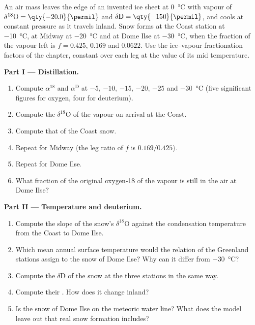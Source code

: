 \begin{problem}\label{pb:b3:stable-isotopes:1}
An air mass leaves the edge of an invented ice sheet at \qty{0}{\celsius}
with vapour of $\delta^{18}\mathrm O = \qty{-20.0}{\permil}$ and $\delta\mathrm D =
\qty{-150}{\permil}$, and cools at constant pressure as it travels inland.
Snow forms at the Coast station at \qty{-10}{\celsius}, at Midway at
\qty{-20}{\celsius} and at Dome Ilse at \qty{-30}{\celsius}, when the fraction
of the vapour left is $f = 0.425$, $0.169$ and $0.0622$. Use the ice--vapour
fractionation factors of the chapter, constant over each leg at the value of
its mid temperature.

\medskip\noindent\textbf{Part I --- Distillation.}
\begin{enumerate}
\item Compute $\alpha^{18}$ and $\alpha^{\mathrm D}$ at $-5$, $-10$, $-15$, $-20$,
$-25$ and \qty{-30}{\celsius} (five significant figures for oxygen, four for
deuterium).
\item Compute the $\delta^{18}\mathrm O$ of the vapour on arrival at the Coast.
\item Compute that of the Coast snow.
\item Repeat for Midway (the leg ratio of $f$ is $0.169/0.425$).
\item Repeat for Dome Ilse.
\item What fraction of the original oxygen-18 of the vapour is still in the air
at Dome Ilse?
\end{enumerate}

\medskip\noindent\textbf{Part II --- Temperature and deuterium.}
\begin{enumerate}[resume]
\item Compute the slope of the snow's $\delta^{18}\mathrm O$ against the
condensation temperature from the Coast to Dome Ilse.
\item Which mean annual surface temperature would the relation of the
Greenland stations assign to the snow of Dome Ilse? Why can it differ from
\qty{-30}{\celsius}?
\item Compute the $\delta\mathrm D$ of the snow at the three stations in the same way.
\item Compute their . How does it change inland?
\item Is the snow of Dome Ilse on the meteoric water line? What does the model
leave out that real snow formation includes?
\end{enumerate}


\end{problem}
